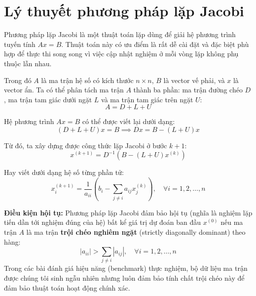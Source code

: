 \section{Lý thuyết phương pháp lặp Jacobi}
Phương pháp lặp Jacobi là một thuật toán lặp dùng để giải hệ phương trình tuyến tính $A x = B$. Thuật toán này có ưu điểm là rất dễ cài đặt và đặc biệt phù hợp để thực thi song song vì việc cập nhật nghiệm ở mỗi vòng lặp không phụ thuộc lẫn nhau.

Trong đó $A$ là ma trận hệ số có kích thước $n \times n$, $B$ là vector vế phải, và $x$ là vector ẩn. Ta có thể phân tách ma trận $A$ thành ba phần: ma trận đường chéo $D$, ma trận tam giác dưới ngặt $L$ và ma trận tam giác trên ngặt $U$:
\[ A = D + L + U \]

Hệ phương trình $Ax = B$ có thể được viết lại dưới dạng:
\[ (D + L + U)x = B \implies Dx = B - (L + U)x \]

Từ đó, ta xây dựng được công thức lặp Jacobi ở bước $k+1$:
\[ x^{(k+1)} = D^{-1} (B - (L + U)x^{(k)}) \]

Hay viết dưới dạng hệ số từng phần tử:
\[ x_i^{(k+1)} = \frac{1}{a_{ii}} \left( b_i - \sum_{j \neq i} a_{ij} x_j^{(k)} \right), \quad \forall i = 1, 2, \dots, n \]

\textbf{Điều kiện hội tụ:}
Phương pháp lặp Jacobi đảm bảo hội tụ (nghĩa là nghiệm lặp tiến dần tới nghiệm đúng của hệ) bất kể giá trị dự đoán ban đầu $x^{(0)}$ nếu ma trận $A$ là ma trận \textbf{trội chéo nghiêm ngặt} (strictly diagonally dominant) theo hàng:
\[ |a_{ii}| > \sum_{j \neq i} |a_{ij}|, \quad \forall i = 1, 2, \dots, n \]
Trong các bài đánh giá hiệu năng (benchmark) thực nghiệm, bộ dữ liệu ma trận được chúng tôi sinh ngẫu nhiên nhưng luôn đảm bảo tính chất trội chéo này để đảm bảo thuật toán hoạt động chính xác.
